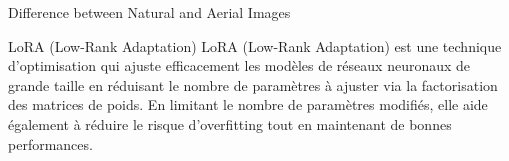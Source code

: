 \begin{subsectionframemod}{Difference between Natural and Aerial Images}
    \begin{alertblock}{LoRA (Low-Rank Adaptation)}
        LoRA (Low-Rank Adaptation) est une technique d'optimisation qui ajuste efficacement les modèles de réseaux neuronaux de grande taille en réduisant le nombre de paramètres à ajuster via la factorisation des matrices de poids.
        En limitant le nombre de paramètres modifiés, elle aide également à réduire le risque d'overfitting tout en maintenant de bonnes performances.
    \end{alertblock}

    \pause
    \pause
\end{subsectionframemod}

